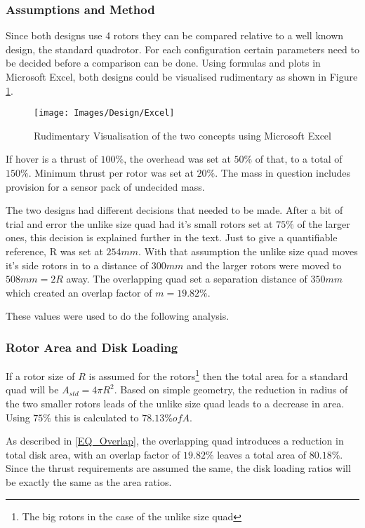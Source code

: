 			\subsubsection{Assumptions and Method}
			Since both designs use 4 rotors they can be compared relative to a well known design, the standard quadrotor. For each configuration certain parameters need to be decided before a comparison can be done. Using formulas and plots in Microsoft Excel\texttrademark, both designs could be visualised rudimentary as shown in Figure \ref{IM_Excel}.
			
			\begin{figure}[H]
			\centering
			\texttt{[image: Images/Design/Excel]}
			\caption{Rudimentary Visualisation of the two concepts using Microsoft Excel\texttrademark}
			\label{IM_Excel}
			\end{figure}
			
			If hover is a thrust of $100\%$, the overhead was set at $50\%$  of that, to a total of $150\%$. Minimum thrust per rotor was set at $20\%$. The mass in question includes provision for a sensor pack of undecided mass. 
			
			The two designs had different decisions that needed to be made. After a bit of trial and error the unlike size quad had it's small rotors set at $75\%$ of the larger ones, this decision is explained further in the text. Just to give a quantifiable reference, R was set at $254mm$. With that assumption the unlike size quad moves it's side rotors in to a distance of $300mm$ and the larger rotors were moved to $508mm = 2R$ away. The overlapping quad set a separation distance of $350mm$ which created an overlap factor of $m = 19.82\%$. 
			
			These values were used to do the following analysis.
	
	
			\subsubsection{Rotor Area and Disk Loading}
			If a rotor size of $R$ is assumed for the rotors\footnote{The big rotors in the case of the unlike size quad} then the total area for a standard quad will be $A_{std} = 4 \pi R^2$. Based on simple geometry, the reduction in radius of the two smaller rotors leads of the unlike size quad leads to a decrease in area. Using $75\%$ this is calculated to $78.13\% of A$. 
			
			As described in \eqref{EQ_Overlap}, the overlapping quad introduces a reduction in total disk area, with an overlap factor of $19.82\%$ leaves a total area of $80.18\%$. Since the thrust requirements are assumed the same, the disk loading ratios will be exactly the same as the area ratios.
			
